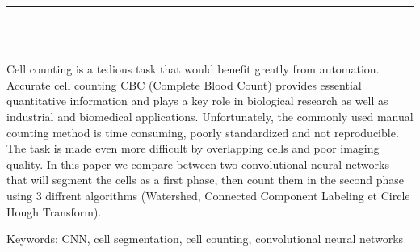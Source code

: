 \documentclass[12pt]{report}
\newenvironment{changemargin}[2]{%
\begin{list}{}{%
\setlength{\topsep}{0pt}%
\setlength{\leftmargin}{#1}%
\setlength{\rightmargin}{#2}%
\setlength{\listparindent}{\parindent}%
\setlength{\itemindent}{\parindent}%
\setlength{\parsep}{\parskip}%
}%
\item[]}{\end{list}}
\begin{document}
\begin{center}
    {\color{Black} \rule{3in}{1.4mm} }\\
    \vspace{0.1in}
    \scshape{\fontsize{34}{46}{\bfseries{\color{Black}{Abstract}}}}
    \\
    \vspace{0.6in}
\end{center}
\begin{changemargin}{0.9cm}{0.9cm}
\hspace*{0.16in}

Cell counting is a tedious task that would benefit greatly from automation. Accurate cell counting CBC (Complete Blood Count) provides essential quantitative information and plays a key role in biological research as well as industrial and biomedical applications. Unfortunately, the commonly used manual counting method is time consuming, poorly standardized and not reproducible. The task is made even more difficult by overlapping cells and poor imaging quality. In this paper we compare between two convolutional neural networks that will segment the cells as a first phase, then count them in the second phase using 3 diffrent algorithms (Watershed, Connected Component Labeling et Circle Hough Transform).

\end{changemargin}

\vspace{1in}

\begin{changemargin}{0.9cm}{0.9cm}
Keywords: CNN, cell segmentation, cell counting, convolutional neural networks
\end{changemargin}

\newpage

\tableofcontents

\newpage

\listoffigures

\newpage

\listoftables

\end{document}

